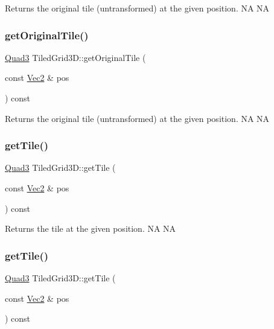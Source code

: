 Returns the original tile (untransformed) at the given position.  NA  NA \mbox{\label{classTiledGrid3D_a653e02adb803ade21b940dacb4da8e41}} 
\subsubsection{\texorpdfstring{get\+Original\+Tile()}{getOriginalTile()}\hspace{0.1cm}{\footnotesize\ttfamily [2/2]}}
{\footnotesize\ttfamily \hyperlink{structQuad3}{Quad3} Tiled\+Grid3\+D\+::get\+Original\+Tile (\begin{DoxyParamCaption}\item[{const \hyperlink{classVec2}{Vec2} \&}]{pos }\end{DoxyParamCaption}) const}

Returns the original tile (untransformed) at the given position.  NA  NA \mbox{\label{classTiledGrid3D_a7c5286c5de85d37e85c4b5ffa9426795}} 
\subsubsection{\texorpdfstring{get\+Tile()}{getTile()}\hspace{0.1cm}{\footnotesize\ttfamily [1/2]}}
{\footnotesize\ttfamily \hyperlink{structQuad3}{Quad3} Tiled\+Grid3\+D\+::get\+Tile (\begin{DoxyParamCaption}\item[{const \hyperlink{classVec2}{Vec2} \&}]{pos }\end{DoxyParamCaption}) const}

Returns the tile at the given position.  NA  NA \mbox{\label{classTiledGrid3D_a7c5286c5de85d37e85c4b5ffa9426795}} 
\subsubsection{\texorpdfstring{get\+Tile()}{getTile()}\hspace{0.1cm}{\footnotesize\ttfamily [2/2]}}
{\footnotesize\ttfamily \hyperlink{structQuad3}{Quad3} Tiled\+Grid3\+D\+::get\+Tile (\begin{DoxyParamCaption}\item[{const \hyperlink{classVec2}{Vec2} \&}]{pos }\end{DoxyParamCaption}) const}

